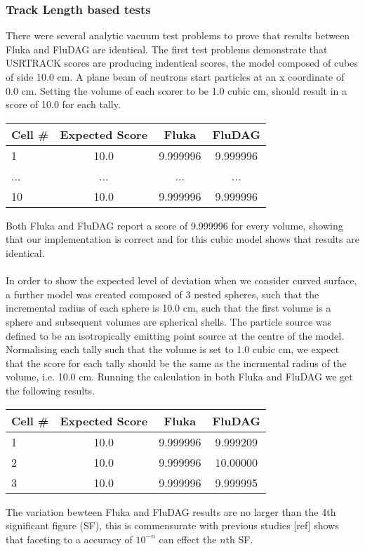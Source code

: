 \documentclass{anstrans}
\begin{document}
\subsubsection*{Track Length based tests}

There were several analytic vacuum test problems to prove that results between Fluka and FluDAG are identical. The first test problems demonstrate that USRTRACK scores are producing indentical scores, the model composed of cubes of side 10.0 cm. A plane beam of neutrons start particles at an x coordinate of 0.0 cm. Setting the volume of each scorer to be 1.0 cubic cm, should result in a score of 10.0 for each tally.

\begin{tabular}{l|c|c|c}
Cell \# & Expected Score & Fluka  & FluDAG \\
\hline
1 & 10.0 & 9.999996 & 9.999996 \\
... & ... & ... & ... \\
10 & 10.0 & 9.999996 & 9.999996 \\
\end{tabular}

Both Fluka and FluDAG report a score of 9.999996 for every volume, showing that our implementation 
is correct and for this cubic model shows that results are identical. 
\\
\\
In order to show the expected level of deviation when we consider curved surface, a further model was created composed of 3 nested spheres, such that the incremental radius of each sphere is 10.0 cm, such that the first volume is a sphere and subsequent volumes are spherical shells. The particle source was defined to be an isotropically emitting point source at the centre of the model. Normalising each tally such that the volume is set to 1.0 cubic cm, we expect that the score for each tally should be the same as the incrmental radius of the volume, i.e. 10.0 cm. Running the calculation in both Fluka and FluDAG we get the following results.
\begin{tabular}{l|c|c|c}
Cell \# & Expected Score & Fluka  & FluDAG \\
\hline
1 & 10.0 & 9.999996 & 9.999209 \\
2 & 10.0 & 9.999996 & 10.00000 \\
3 & 10.0 & 9.999996 & 9.999995 \\
\end{tabular}
The variation bewteen Fluka and FluDAG results are no larger than the 4th significant figure (SF), this is commensurate with previous studies [ref] shows that faceting to a accuracy of $10^{-n}$ can effect the $n$th SF.
\end{document}
